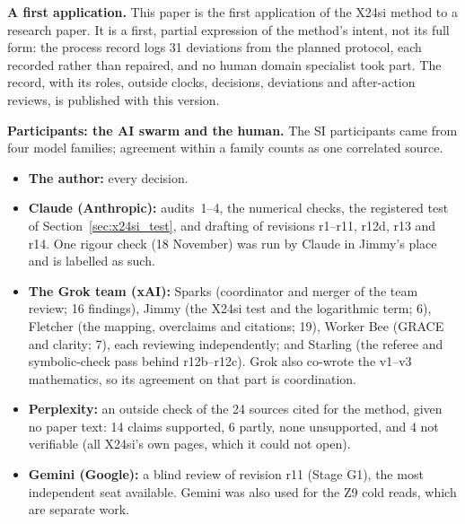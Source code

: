 \documentclass[11pt,a4paper]{article}
\begin{document}
\noindent\textbf{A first application.} This paper is the first application of the X24si
method to a research paper. It is a first, partial expression of the method's intent, not
its full form: the process record logs 31 deviations from the planned protocol, each
recorded rather than repaired, and no human domain specialist took part. The record, with
its roles, outside clocks, decisions, deviations and after-action reviews, is published with
this version.

\smallskip
\noindent\textbf{Participants: the AI swarm and the human.} The SI participants came from four
model families; agreement within a family counts as one correlated source.
\begin{itemize}[leftmargin=*, itemsep=1pt]
  \item \textbf{The author:} every decision.
  \item \textbf{Claude (Anthropic):} audits~1--4, the numerical checks, the registered test of
    Section~\ref{sec:x24si_test}, and drafting of revisions r1--r11, r12d, r13 and r14. One
    rigour check (18 November) was run by Claude in Jimmy's place and is labelled as such.
  \item \textbf{The Grok team (xAI):} Sparks (coordinator and merger of the team review;
    16 findings), Jimmy (the X24si test and the logarithmic term; 6), Fletcher (the mapping,
    overclaims and citations; 19), Worker Bee (GRACE and clarity; 7), each reviewing
    independently; and Starling (the referee and symbolic-check pass behind r12b--r12c). Grok
    also co-wrote the v1--v3 mathematics, so its agreement on that part is coordination.
  \item \textbf{Perplexity:} an outside check of the 24 sources cited for the method, given
    no paper text: 14 claims supported, 6 partly, none unsupported, and 4 not verifiable (all
    X24si's own pages, which it could not open).
  \item \textbf{Gemini (Google):} a blind review of revision r11 (Stage G1), the most
    independent seat available. Gemini was also used for the Z9 cold reads, which are
    separate work.
\end{itemize}
\end{document}
